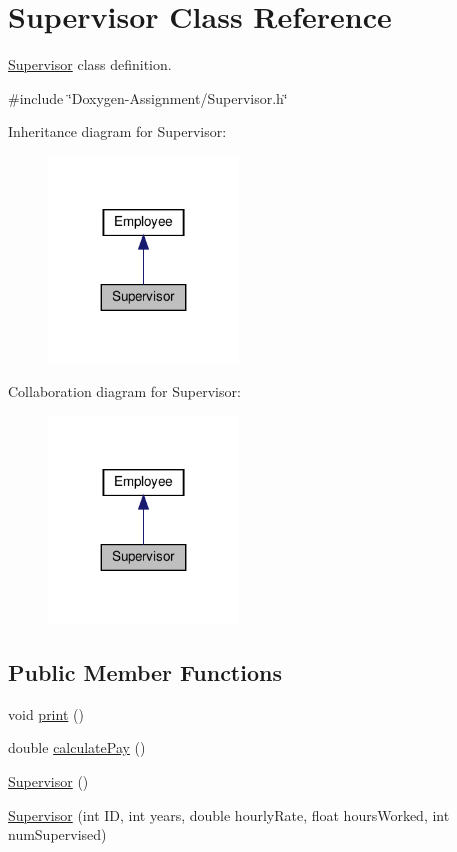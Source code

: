 \hypertarget{classSupervisor}{}\section{Supervisor Class Reference}
\label{classSupervisor}


\hyperlink{classSupervisor}{Supervisor} class definition.  




{\ttfamily \#include \char`\"{}Doxygen-\/\+Assignment/\+Supervisor.\+h\char`\"{}}



Inheritance diagram for Supervisor\+:\nopagebreak
\begin{figure}[H]
\begin{center}
\leavevmode
\includegraphics[width=143pt]{classSupervisor__inherit__graph}
\end{center}
\end{figure}


Collaboration diagram for Supervisor\+:\nopagebreak
\begin{figure}[H]
\begin{center}
\leavevmode
\includegraphics[width=143pt]{classSupervisor__coll__graph}
\end{center}
\end{figure}
\subsection*{Public Member Functions}
\begin{DoxyCompactItemize}
\item 
void \hyperlink{classSupervisor_a92483dc9a54904d79b46c6ec4efb3f54}{print} ()
\item 
double \hyperlink{classSupervisor_aa37daa89523c08b84ae8141299e036f8}{calculate\+Pay} ()
\item 
\hyperlink{classSupervisor_a9d7eafc36b5429092ba0f758bc7841c4}{Supervisor} ()
\item 
\hyperlink{classSupervisor_a02d9245744652deb20e9408001d6ed3b}{Supervisor} (int ID, int years, double hourly\+Rate, float hours\+Worked, int num\+Supervised)
\end{DoxyCompactItemize}
